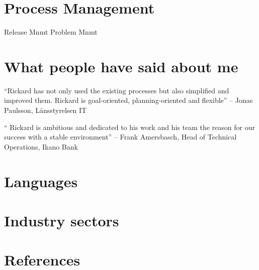 \documentclass[11pt,a4paper,sans]{moderncv}
\begin{document}

\section{Process Management}
 {Release Mnmt}
 {Problem Mnmt}







\section{What people have said about me}

\begin{quotelist}
\item  ``Rickard has not only used the existing processes but also simplified and improved them.
        Rickard is goal-oriented, planning-oriented and flexible''  -- Jonas Paulsson, Länsstyrelsen IT
\item
        `` Rickard is ambitious and dedicated to his work and his team the reason for our success with a stable environment''  -- Frank Amersbasch, Head of Technical Operations, Ikano Bank
  \end{quotelist}

\section{Languages}

\section{Industry sectors}

\section{References}

\nocite{*}

\clearpage
\Large
\end{document}
